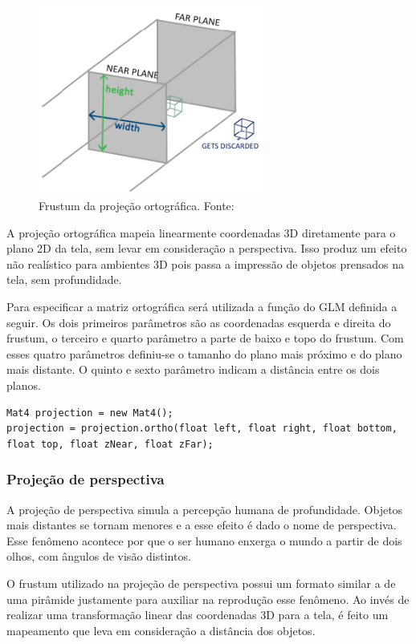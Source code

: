 \documentclass[12pt, 
openright, 
oneside, 
a4paper,    
brazil]{facom-ufu-abntex2}
\begin{document}
\begin{figure}[H]
	\centering
	\includegraphics[width=20em]{imagens/orthographicProjection.png}
	\caption{Frustum da projeção ortográfica. Fonte:~\cite{LearnOpenGL}}
\end{figure}

A projeção ortográfica mapeia linearmente coordenadas 3D diretamente para o plano 2D da tela, sem levar em consideração a perspectiva. Isso produz um efeito não realístico para ambientes 3D pois passa a impressão de objetos prensados na tela, sem profundidade.

Para especificar a matriz ortográfica será utilizada a função do GLM definida a seguir. Os dois primeiros parâmetros são as coordenadas esquerda e direita do frustum, o terceiro e quarto parâmetro a parte de baixo e topo do frustum. Com esses quatro parâmetros definiu-se o tamanho do plano mais próximo e do plano mais distante. O quinto e sexto parâmetro indicam a distância entre os dois planos.

\begin{lstlisting}[caption=Função Ortho do GLM]
Mat4 projection = new Mat4();
projection = projection.ortho(float left, float right, float bottom, float top, float zNear, float zFar);
\end{lstlisting}

\subsubsection{Projeção de perspectiva}
A projeção de perspectiva simula a percepção humana de profundidade. Objetos mais distantes se tornam menores e a esse efeito é dado o nome de perspectiva. Esse fenômeno acontece por que o ser humano enxerga o mundo a partir de dois olhos, com ângulos de visão distintos.

O frustum utilizado na projeção de perspectiva possui um formato similar a de uma pirâmide justamente para auxiliar na reprodução esse fenômeno. Ao invés de realizar uma transformação linear das coordenadas 3D para a tela, é feito um mapeamento que leva em consideração a distância dos objetos.
\end{document}
